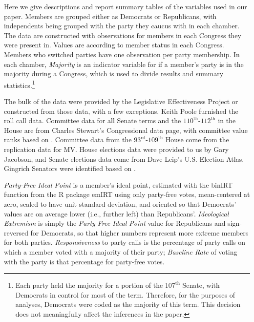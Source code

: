 \documentclass[12pt]{article}
\begin{document}
Here we give descriptions and report summary tables of the variables used in our paper. Members are grouped either as Democrats or Republicans, with independents being grouped with the party they caucus with in each chamber. The data are constructed with observations for members in each Congress they were present in. Values are according to member status in each Congress.
Members who switched parties have one observation per party membership.
In each chamber, \textit{Majority} is an indicator variable for if a member's party is in the majority during a Congress, which is used to divide results and summary statistics.\footnote{\doublespacing\normalsize Each party held the majority for a portion of the $107^{\text{th}}$ Senate, with Democrats in control for most of the term.  Therefore, for the purposes of analyses, Democrats were coded as the majority of this term.  This decision does not meaningfully affect the inferences in the paper.}

The bulk of the data were provided by the Legislative Effectiveness Project \citep{Volden:2014} or constructed from those data, with a few exceptions. Keith Poole furnished the roll call data.  Committee data for all Senate terms and the $110^{\text{th}}$-$112^{\text{th}}$ in the House are from Charles Stewart's Congressional data page, with committee value ranks based on \cite{Groseclose:1998}.
Committee data from the $93^{\text{rd}}$-$109^{\text{th}}$ House come from the replication data for MV.  House elections data were provided to us by Gary Jacobson, and Senate elections data come from Dave Leip's U.S. Election Atlas.
Gingrich Senators were identified based on \cite{Theriault:2013}.

\textit{Party-Free Ideal Point} is a member's ideal point, estimated with the \textsf{binIRT} function from the \textsf{R} package \textsf{emIRT} using only party-free votes, mean-centered at zero, scaled to have unit standard deviation, and oriented so that Democrats' values are on average lower (i.e., further left) than Republicans'. \textit{Ideological Extremism} is simply the \textit{Party Free Ideal Point} value for Republicans and sign-reversed for Democrats, so that higher numbers represent more extreme members for both parties. \textit{Responsiveness} to party calls is the percentage of party calls on which a member voted with a majority of their party; \textit{Baseline Rate}  of voting with the party is that percentage for party-free votes.
\end{document}
